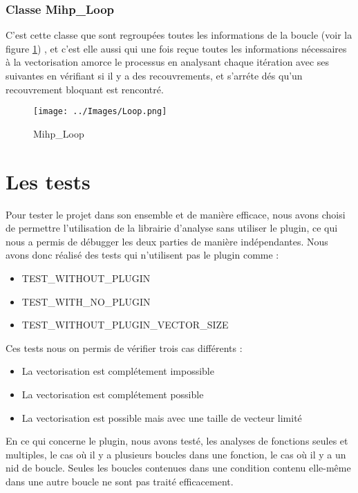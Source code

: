 \documentclass[12pt,french]{article}
\begin{document}
\subsubsection{\color{blue} Classe Mihp\_Loop}
C'est cette classe que sont regroupées toutes les informations de la boucle (voir la figure \ref{Loop}) , et c'est elle aussi qui une fois reçue toutes les informations nécessaires à la vectorisation amorce le processus en analysant chaque itération avec ses suivantes en vérifiant si il y a des recouvrements, et s'arréte dés qu'un recouvrement bloquant est rencontré.

\begin{figure} %
	\begin{center}
		\texttt{[image: ../Images/Loop.png]}
	\end{center}
	\caption{ Mihp\_Loop}
	\label{Loop}
\end{figure}



\section{\color{blue}Les tests}


Pour tester le projet dans son ensemble et de manière efficace, nous avons choisi de permettre l'utilisation de la librairie d'analyse sans utiliser le plugin, ce qui nous a permis de débugger les deux parties de manière indépendantes. Nous avons donc réalisé des tests qui n'utilisent pas le plugin comme :

\begin{itemize}
\item TEST\_WITHOUT\_PLUGIN
\item TEST\_WITH\_NO\_PLUGIN
\item TEST\_WITHOUT\_PLUGIN\_VECTOR\_SIZE
\end{itemize}

Ces tests nous on permis de vérifier trois cas différents :

\begin{itemize}
\item La vectorisation est complétement impossible
\item La vectorisation est complétement possible
\item La vectorisation est possible mais avec une taille de vecteur limité
\end{itemize}

En ce qui concerne le plugin, nous avons testé, les analyses de fonctions seules et multiples, le cas où il y a plusieurs boucles dans une fonction, le cas où il y a un nid de boucle. Seules les boucles contenues dans une condition contenu elle-même dans une autre boucle ne sont pas traité efficacement.
\end{document}
